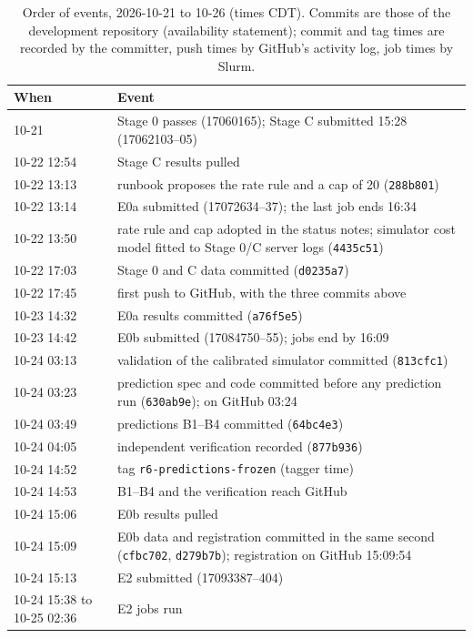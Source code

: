 \begin{table}[p]
\centering\footnotesize
\caption{Order of events, 2026-10-21 to 10-26 (times CDT). Commits are those of the development repository (availability statement); commit and tag times are recorded by the committer, push times by GitHub's activity log, job times by Slurm.}\label{tab:timeline}
\begin{tabular}{@{}p{1.75cm} >{\raggedright\arraybackslash}p{5.6cm}@{}}
\toprule
When & Event\\
\midrule
10-21 & Stage 0 passes (17060165); Stage C submitted 15:28 (17062103--05)\\
10-22 12:54 & Stage C results pulled\\
10-22 13:13 & runbook proposes the rate rule and a cap of 20 (\texttt{288b801})\\
10-22 13:14 & E0a submitted (17072634--37); the last job ends 16:34\\
10-22 13:50 & rate rule and cap adopted in the status notes; simulator cost model fitted to Stage 0/C server logs (\texttt{4435c51})\\
10-22 17:03 & Stage 0 and C data committed (\texttt{d0235a7})\\
10-22 17:45 & first push to GitHub, with the three commits above\\
10-23 14:32 & E0a results committed (\texttt{a76f5e5})\\
10-23 14:42 & E0b submitted (17084750--55); jobs end by 16:09\\
10-24 03:13 & validation of the calibrated simulator committed (\texttt{813cfc1})\\
10-24 03:23 & prediction spec and code committed before any prediction run (\texttt{630ab9e}); on GitHub 03:24\\
10-24 03:49 & predictions B1--B4 committed (\texttt{64bc4e3})\\
10-24 04:05 & independent verification recorded (\texttt{877b936})\\
10-24 14:52 & tag \texttt{r6-predictions-frozen} (tagger time)\\
10-24 14:53 & B1--B4 and the verification reach GitHub\\
10-24 15:06 & E0b results pulled\\
10-24 15:09 & E0b data and registration committed in the same second (\texttt{cfbc702}, \texttt{d279b7b}); registration on GitHub 15:09:54\\
10-24 15:13 & E2 submitted (17093387--404)\\
10-24 15:38 to 10-25 02:36 & E2 jobs run\\

\end{tabular}
\end{table}
